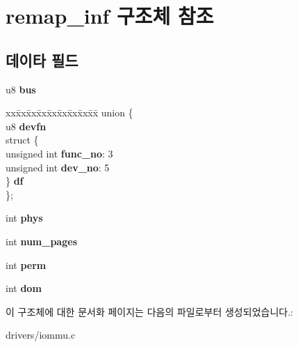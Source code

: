 \section{remap\-\_\-inf 구조체 참조}
\label{structremap__inf}
\subsection*{데이타 필드}
\begin{DoxyCompactItemize}
\item 
u8 {\bfseries bus}\label{structremap__inf_a580f9145f92e4519518a4ca7ec4470e1}

\item 
\begin{tabbing}
xx\=xx\=xx\=xx\=xx\=xx\=xx\=xx\=xx\=\kill
union \{\\
\>u8 {\bfseries devfn}\\
\>struct \{\\
\>\>unsigned int {\bfseries func\_no}: 3\\
\>\>unsigned int {\bfseries dev\_no}: 5\\
\>\} {\bfseries df}\\
\}; \label{structremap__inf_a84ce2520562ceb0b4da574ea05383b80}
\\

\end{tabbing}\item 
int {\bfseries phys}\label{structremap__inf_a0fcc99d35bfc7374e758e743fb2e4dee}

\item 
int {\bfseries num\-\_\-pages}\label{structremap__inf_af2b698bf41d6ad470284a6c29bcac936}

\item 
int {\bfseries perm}\label{structremap__inf_a9e3e1739571ba4832fcdce8e978a20ad}

\item 
int {\bfseries dom}\label{structremap__inf_a9dbb15fa353bc503a9a5c13e32adf425}

\end{DoxyCompactItemize}


이 구조체에 대한 문서화 페이지는 다음의 파일로부터 생성되었습니다.\-:\begin{DoxyCompactItemize}
\item 
drivers/iommu.\-c\end{DoxyCompactItemize}
